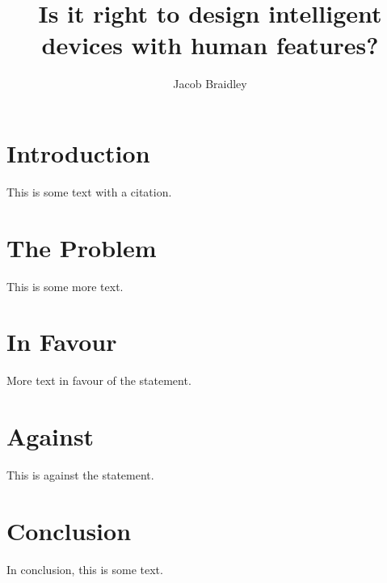 \documentclass{article}
\title{\Large Is it right to design intelligent devices with human features?}
\author{Jacob Braidley}
\begin{document}
\maketitle

\vspace{1cm}

\section{Introduction}
This is some text\cite{brin1998anatomy} with a citation.

\section{The Problem}
This is some more text.

\section{In Favour}
More text in favour of the statement.

\section{Against}
This is against the statement.

\section{Conclusion}
In conclusion, this is some text.

\vspace{.5cm}



\end{document}
